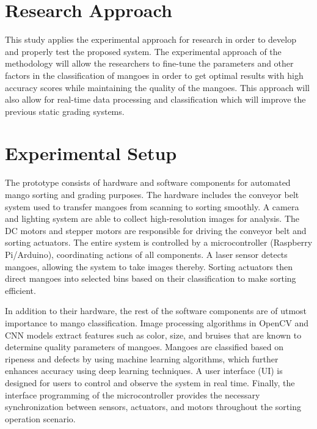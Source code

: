 \section{Research Approach}
This study applies the experimental approach for research in order to develop and properly test the proposed system. The experimental approach of the methodology will allow the researchers to fine-tune the parameters and other factors in the classification of mangoes in order to get optimal results with high accuracy scores while maintaining the quality of the mangoes. This approach will also allow for real-time data processing and classification which will improve the previous static grading systems.

\section{Experimental Setup}
The prototype consists of hardware and software components for automated mango sorting and grading purposes. The hardware includes the conveyor belt system used to transfer mangoes from scanning to sorting smoothly. A camera and lighting system are able to collect high-resolution images for analysis. The DC motors and stepper motors are responsible for driving the conveyor belt and sorting actuators. The entire system is controlled by a microcontroller (Raspberry Pi/Arduino), coordinating actions of all components. A laser sensor detects mangoes, allowing the system to take images thereby. Sorting actuators then direct mangoes into selected bins based on their classification to make sorting efficient.

In addition to their hardware, the rest of the software components are of utmost importance to mango classification. Image processing algorithms in OpenCV and CNN models extract features such as color, size, and bruises that are known to determine quality parameters of mangoes. Mangoes are classified based on ripeness and defects by using machine learning algorithms, which further enhances accuracy using deep learning techniques. A user interface (UI) is designed for users to control and observe the system in real time. Finally, the interface programming of the microcontroller provides the necessary synchronization between sensors, actuators, and motors throughout the sorting operation scenario.

